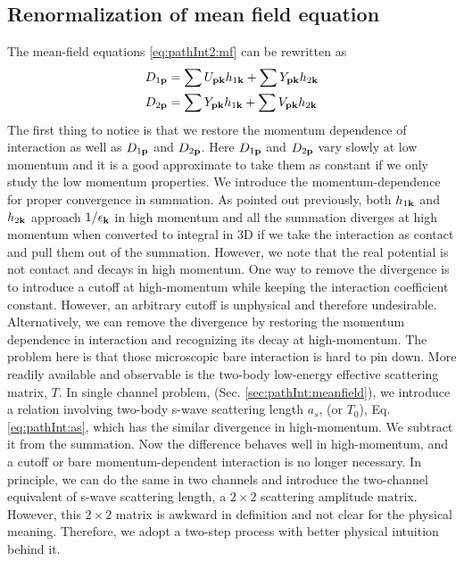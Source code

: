 \subsection {Renormalization of mean field equation}
The mean-field equations \ref{eq:pathInt2:mf} can be rewritten as 
\begin{align}
D_{1\mathbf{p}}&=\sum{}U_{\mathbf{p}\mathbf{k}}h_{1\mathbf{k}}+\sum{}Y_{\mathbf{p}\mathbf{k}}h_{2\mathbf{k}}\label{eq:pathInt2:mfopen}\\
D_{2\mathbf{p}}&=\sum{}Y_{\mathbf{p}\mathbf{k}}h_{1\mathbf{k}}+\sum{}V_{\mathbf{p}\mathbf{k}}h_{2\mathbf{k}}\label{eq:pathInt2:mfclose}
\end{align}
The first thing to notice is that we restore the momentum dependence of interaction as well as $D_{1\mathbf{p}}$ and $D_{2\mathbf{p}}$.     Here $D_{1\mathbf{p}}$ and $D_{2\mathbf{p}}$ vary slowly at low momentum and  it is a good approximate to take them as constant if we only study the low momentum properties.  We introduce the momentum-dependence for proper convergence in summation. As pointed out previously, both $h_{1\mathbf{k}}$ and $h_{2\mathbf{k}}$ approach $1/\epsilon_{\mathbf{k}}$ in high momentum and all the summation diverges at high momentum when converted to integral in 3D if we take the interaction as contact and pull them out of the summation.  However, we note that the real potential is not contact and decays in high momentum.  One way to remove the divergence is to  introduce  a cutoff at high-momentum while keeping the interaction coefficient constant.  However, an arbitrary cutoff is unphysical and therefore undesirable.  Alternatively, we can remove the divergence by restoring the momentum dependence in interaction and recognizing its decay at high-momentum.    The problem here is that those microscopic bare interaction is hard to pin down.      More readily available and observable is the two-body low-energy effective scattering matrix, $T$.             In single channel problem, (Sec. \ref{sec:pathInt:meanfield}),  we  introduce a relation involving two-body s-wave scattering length $a_{s}$, (or $T_{0}$), Eq. \eqref{eq:pathInt:as}, which has the similar divergence in high-momentum.  We subtract it from the summation.  Now the difference behaves well in high-momentum,  and a cutoff or bare momentum-dependent interaction is no longer necessary.  In principle, we can do the same in two channels and introduce the two-channel equivalent of s-wave scattering length, a $2\times2$ scattering amplitude matrix.  However, this $2\times2$ matrix is awkward in definition and not clear for the physical meaning.   Therefore, we adopt a two-step process with better physical intuition behind it.   

